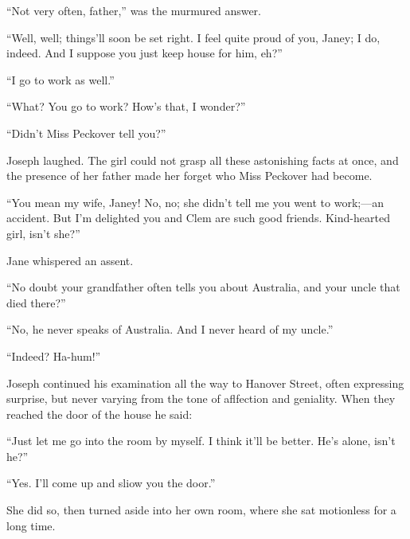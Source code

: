 ``Not very often, father,'' was the murmured answer.

``Well, well; things'll soon be set right. I feel quite proud of you,
Janey; I do, indeed. And I suppose you just keep house for him, eh?''

``I go to work as well.''

``What? You go to work? How's that, I wonder?''

``Didn't Miss Peckover tell you?''

Joseph laughed. The girl could not grasp all these astonishing facts at
once, and the presence of her father made her forget who Miss Peckover
had become.

``You mean my wife, Janey! No, no; she didn't tell me you went to
work;---an accident. But I'm delighted you and Clem are such good
friends. Kind-hearted girl, isn't she?''

Jane whispered an assent.

``No doubt your grandfather often tells you about Australia, and your
uncle that died there?''

{\protect\hypertarget{77}{}{}}``No, he never speaks of Australia. And I
never heard of my uncle.''

``Indeed? Ha-hum!''

Joseph continued his examination all the way to Hanover Street, often
expressing surprise, but never varying from the tone of aflfection and
geniality. When they reached the door of the house he said:

``Just let me go into the room by myself. I think it'll be better. He's
alone, isn't he?''

``Yes. I'll come up and sliow you the door.''

She did so, then turned aside into her own room, where she sat
motionless for a long time.

